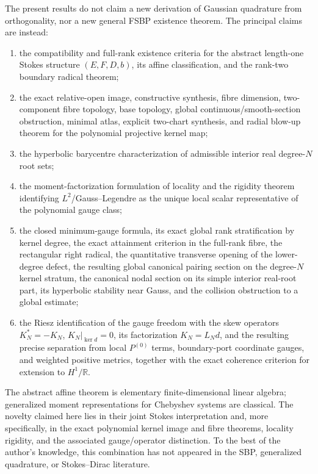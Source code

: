 \documentclass[11pt,a4paper]{article}
\theoremstyle{definition}
\theoremstyle{remark}
\newcommand{\R}{\mathbb{R}}
\newcommand{\Ker}{\operatorname{ker}}
\begin{document}
The present results do not claim a new derivation of Gaussian quadrature from orthogonality,
nor a new general FSBP existence theorem.  The principal claims are instead:
\begin{enumerate}
\item the compatibility and full-rank existence criteria for the abstract length-one Stokes
structure $(E,F,D,b)$, its affine classification, and the rank-two boundary radical theorem;
\item the exact relative-open image, constructive synthesis, fibre dimension, two-component
fibre topology, base topology, global continuous/smooth-section obstruction, minimal atlas,
explicit two-chart synthesis, and radial blow-up theorem for the polynomial projective
kernel map;
\item the hyperbolic barycentre characterization of admissible interior real degree-$N$
root sets;
\item the moment-factorization formulation of locality and the rigidity theorem identifying
$L^2$/Gauss--Legendre as the unique local scalar representative of the polynomial gauge
class;
\item the closed minimum-gauge formula, its exact global rank stratification by kernel degree,
the exact attainment criterion in the full-rank fibre, the rectangular right radical, the
quantitative transverse opening of the lower-degree defect, the
resulting global canonical pairing section on the degree-$N$ kernel stratum, the
canonical nodal section on its simple interior real-root part, its hyperbolic stability near Gauss,
and the collision obstruction to a global estimate;
\item the Riesz identification of the gauge freedom with the skew operators
$K_N^*=-K_N$, $\left.K_N\right|_{\Ker d}=0$, its factorization $K_N=L_Nd$, and the resulting precise
separation from local $P^{(0)}$ terms, boundary-port coordinate gauges, and weighted positive
metrics, together with the exact coherence criterion for extension to $H^1/\R$.
\end{enumerate}
The abstract affine theorem is elementary finite-dimensional linear algebra; generalized
moment representations for Chebyshev systems are classical.  The novelty claimed here lies
in their joint Stokes interpretation and, more specifically, in the exact polynomial kernel
image and fibre theorems, locality rigidity, and the associated gauge/operator distinction.
To the best of the author's knowledge, this combination has not appeared in the SBP,
generalized quadrature, or Stokes--Dirac literature.
\end{document}
